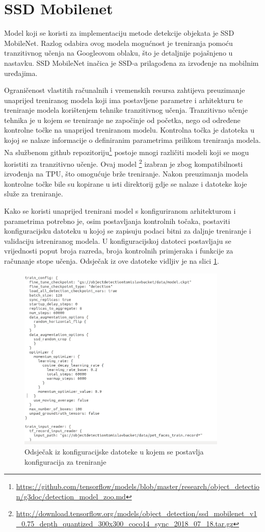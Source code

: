 \section{SSD Mobilenet}
Model koji se koristi za implementaciju metode detekcije objekata je SSD MobileNet.
Razlog odabira ovog modela mogućnost je treniranja pomoću tranzitivnog učenja na Googleovom oblaku, što je detaljnije pojašnjeno u nastavku.
SSD MobileNet inačica je SSD-a prilagođena za izvođenje na mobilnim uređajima.

Ograničenost vlastitih računalnih i vremenskih resursa zahtijeva preuzimanje unaprijed treniranog modela koji ima postavljene parametre i arhitekturu te treniranje modela korištenjem tehnike tranzitivnog učenja.
Tranzitivno učenje tehnika je u kojem se treniranje ne započinje od početka, nego od određene kontrolne točke na unaprijed treniranom modelu. Kontrolna točka je datoteka u kojoj se nalaze informacije o definiranim parametrima prilikom treniranja modela. 
Na službenom github repozitoriju\footnote{\url{https://github.com/tensorflow/models/blob/master/research/object_detection/g3doc/detection_model_zoo.md}}
postoje mnogi različiti modeli koji se mogu koristiti za tranzitivno učenje. 
Ovaj model \footnote{\url{http://download.tensorflow.org/models/object_detection/ssd_mobilenet_v1_0.75_depth_quantized_300x300_coco14_sync_2018_07_18.tar.gz}}
izabran je zbog kompatibilnosti izvođenja na TPU, što omogućuje brže treniranje. Nakon preuzimanja modela kontrolne točke bile su kopirane u isti direktorij gdje se nalaze i datoteke koje služe za treniranje.

Kako se koristi unaprijed trenirani model s konfiguriranom arhitekturom i parametrima potrebno je, osim postavljanja kontrolnih točaka, postaviti konfiguracijsku datoteku u kojoj se zapisuju podaci bitni za daljnje treniranje i
validaciju istreniranog modela. U konfiguracijskoj datoteci postavljaju se vrijednosti poput broja razreda, broja kontrolnih primjeraka i funkcije za računanje stope učenja. 
Odsječak iz ove datoteke vidljiv je na slici \ref{Pipeline}.

\begin{figure}[htb]
    \centering
    \includegraphics[width=10cm]{img/pipeline.png}
    \caption{Odsječak iz konfiguracijske datoteke u kojem se postavlja konfiguracija za treniranje}
    \label{Pipeline}
\end{figure}


